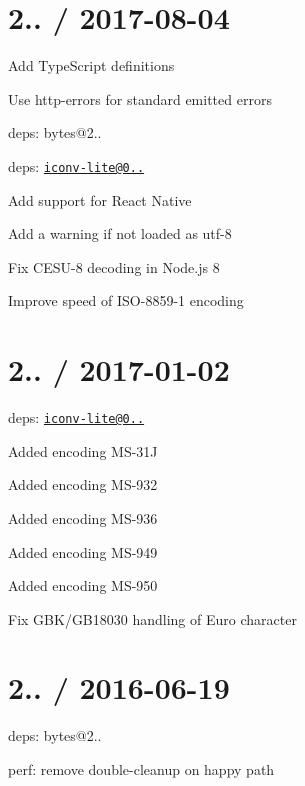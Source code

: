 \section*{2.. / 2017-\/08-\/04 }


\begin{DoxyItemize}
\item Add Type\+Script definitions
\item Use {\ttfamily http-\/errors} for standard emitted errors
\item deps\+: bytes@2..
\item deps\+: \href{mailto:iconv-lite@0.4.18}{\tt iconv-\/lite@0..}
\begin{DoxyItemize}
\item Add support for React Native
\item Add a warning if not loaded as utf-\/8
\item Fix C\+E\+S\+U-\/8 decoding in Node.\+js 8
\item Improve speed of I\+S\+O-\/8859-\/1 encoding
\end{DoxyItemize}
\end{DoxyItemize}

\section*{2.. / 2017-\/01-\/02 }


\begin{DoxyItemize}
\item deps\+: \href{mailto:iconv-lite@0.4.15}{\tt iconv-\/lite@0..}
\begin{DoxyItemize}
\item Added encoding M\+S-\/31J
\item Added encoding M\+S-\/932
\item Added encoding M\+S-\/936
\item Added encoding M\+S-\/949
\item Added encoding M\+S-\/950
\item Fix G\+B\+K/\+G\+B18030 handling of Euro character
\end{DoxyItemize}
\end{DoxyItemize}

\section*{2.. / 2016-\/06-\/19 }


\begin{DoxyItemize}
\item deps\+: bytes@2..
\item perf\+: remove double-\/cleanup on happy path
\end{DoxyItemize}

